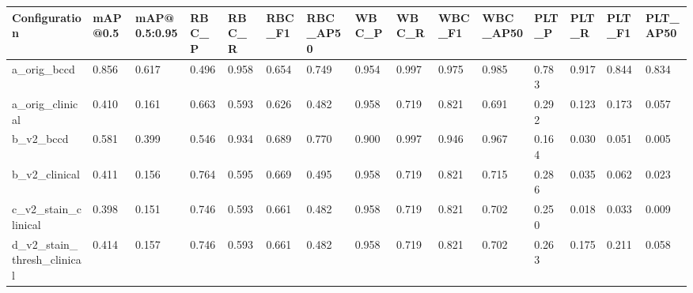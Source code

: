 \begin{tabular}{lllllllllllllll}
\toprule
Configuration & mAP@0.5 & mAP@0.5:0.95 & RBC_P & RBC_R & RBC_F1 & RBC_AP50 & WBC_P & WBC_R & WBC_F1 & WBC_AP50 & PLT_P & PLT_R & PLT_F1 & PLT_AP50 \\
\midrule
a_orig_bccd & 0.856 & 0.617 & 0.496 & 0.958 & 0.654 & 0.749 & 0.954 & 0.997 & 0.975 & 0.985 & 0.783 & 0.917 & 0.844 & 0.834 \\
a_orig_clinical & 0.410 & 0.161 & 0.663 & 0.593 & 0.626 & 0.482 & 0.958 & 0.719 & 0.821 & 0.691 & 0.292 & 0.123 & 0.173 & 0.057 \\
b_v2_bccd & 0.581 & 0.399 & 0.546 & 0.934 & 0.689 & 0.770 & 0.900 & 0.997 & 0.946 & 0.967 & 0.164 & 0.030 & 0.051 & 0.005 \\
b_v2_clinical & 0.411 & 0.156 & 0.764 & 0.595 & 0.669 & 0.495 & 0.958 & 0.719 & 0.821 & 0.715 & 0.286 & 0.035 & 0.062 & 0.023 \\
c_v2_stain_clinical & 0.398 & 0.151 & 0.746 & 0.593 & 0.661 & 0.482 & 0.958 & 0.719 & 0.821 & 0.702 & 0.250 & 0.018 & 0.033 & 0.009 \\
d_v2_stain_thresh_clinical & 0.414 & 0.157 & 0.746 & 0.593 & 0.661 & 0.482 & 0.958 & 0.719 & 0.821 & 0.702 & 0.263 & 0.175 & 0.211 & 0.058 \\
\bottomrule
\end{tabular}
